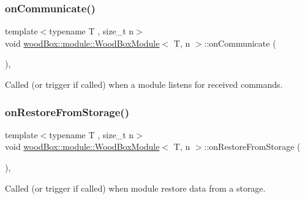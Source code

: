 \subsubsection{\texorpdfstring{on\+Communicate()}{onCommunicate()}}
{\footnotesize\ttfamily template$<$typename T , size\+\_\+t n$>$ \\
void \mbox{\hyperlink{classwood_box_1_1module_1_1_wood_box_module}{wood\+Box\+::module\+::\+Wood\+Box\+Module}}$<$ T, n $>$\+::on\+Communicate (\begin{DoxyParamCaption}{ }\end{DoxyParamCaption})\hspace{0.3cm}{\ttfamily [inline]}, {\ttfamily [protected]}}

Called (or trigger if called) when a module listens for received commands. \mbox{\label{classwood_box_1_1module_1_1_wood_box_module_a89395caa73cadc63c576931b45400c2d}} 
\subsubsection{\texorpdfstring{on\+Restore\+From\+Storage()}{onRestoreFromStorage()}}
{\footnotesize\ttfamily template$<$typename T , size\+\_\+t n$>$ \\
void \mbox{\hyperlink{classwood_box_1_1module_1_1_wood_box_module}{wood\+Box\+::module\+::\+Wood\+Box\+Module}}$<$ T, n $>$\+::on\+Restore\+From\+Storage (\begin{DoxyParamCaption}{ }\end{DoxyParamCaption})\hspace{0.3cm}{\ttfamily [inline]}, {\ttfamily [protected]}}

Called (or trigger if called) when module restore data from a storage. \mbox{\label{classwood_box_1_1module_1_1_wood_box_module_a227e8b23e8435f622f4d59eb6847e98b}} 
